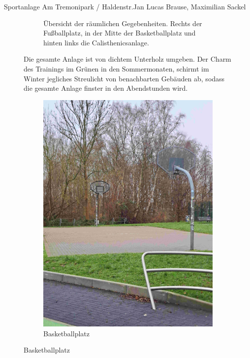 \documentclass{../../templates/amendment}
\begin{document}
\begin{boxed}{Sportanlage Am Tremonipark / Haldenstr.}{Jan Lucas Brause, Maximilian Sackel}
\begin{figure}[htpb]
\begin{subfigure}[t]{0.5\textwidth}
\begin{center}
                \caption{Übersicht der räumlichen Gegebenheiten. Rechts der Fußballplatz, in der Mitte der Basketballplatz und hinten links die Calisthenicsanlage.}
            \end{center}
        \end{subfigure}
        \caption{Die gesamte Anlage ist von dichtem Unterholz umgeben. Der Charm des Trainings im Grünen in den Sommermonaten, schirmt im Winter jegliches Streulicht von benachbarten Gebäuden ab, sodass die gesamte Anlage finster in den Abendstunden wird.}
    \end{figure}

    \begin{figure}[htpb]
        \centering
        \begin{subfigure}[t]{0.32\textwidth}
            \begin{center}
                \includegraphics[width=\linewidth]{pictures/photo2.jpg}
                \caption{Basketballplatz}%
            \end{center}

\end{subfigure}
\end{figure}
\end{boxed}
\end{document}

